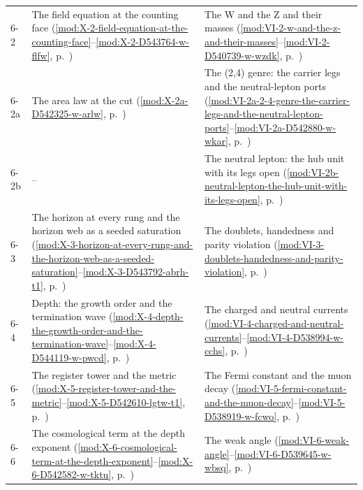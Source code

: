 {\begin{longtable}{p{11mm}p{70mm}p{60mm}}
6-2 & The field equation at the counting face (\ref{mod:X-2-field-equation-at-the-counting-face}--\ref{mod:X-2-D543764-w-flfw}, p.~\pageref{mod:X-2-field-equation-at-the-counting-face}) & The W and the Z and their masses (\ref{mod:VI-2-w-and-the-z-and-their-masses}--\ref{mod:VI-2-D540739-w-wzdk}, p.~\pageref{mod:VI-2-w-and-the-z-and-their-masses}) \\
6-2a & The area law at the cut (\ref{mod:X-2a-D542325-w-arlw}, p.~\pageref{mod:X-2a-D542325-w-arlw}) & The (2,4) genre: the carrier legs and the neutral-lepton ports (\ref{mod:VI-2a-2-4-genre-the-carrier-legs-and-the-neutral-lepton-ports}--\ref{mod:VI-2a-D542880-w-wkar}, p.~\pageref{mod:VI-2a-2-4-genre-the-carrier-legs-and-the-neutral-lepton-ports}) \\
6-2b & -- & The neutral lepton: the hub unit with its legs open (\ref{mod:VI-2b-neutral-lepton-the-hub-unit-with-its-legs-open}, p.~\pageref{mod:VI-2b-neutral-lepton-the-hub-unit-with-its-legs-open}) \\
6-3 & The horizon at every rung and the horizon web as a seeded saturation (\ref{mod:X-3-horizon-at-every-rung-and-the-horizon-web-as-a-seeded-saturation}--\ref{mod:X-3-D543792-abrh-t1}, p.~\pageref{mod:X-3-horizon-at-every-rung-and-the-horizon-web-as-a-seeded-saturation}) & The doublets, handedness and parity violation (\ref{mod:VI-3-doublets-handedness-and-parity-violation}, p.~\pageref{mod:VI-3-doublets-handedness-and-parity-violation}) \\
6-4 & Depth: the growth order and the termination wave (\ref{mod:X-4-depth-the-growth-order-and-the-termination-wave}--\ref{mod:X-4-D544119-w-pwcd}, p.~\pageref{mod:X-4-depth-the-growth-order-and-the-termination-wave}) & The charged and neutral currents (\ref{mod:VI-4-charged-and-neutral-currents}--\ref{mod:VI-4-D538994-w-cchs}, p.~\pageref{mod:VI-4-charged-and-neutral-currents}) \\
6-5 & The register tower and the metric (\ref{mod:X-5-register-tower-and-the-metric}--\ref{mod:X-5-D542610-lgtw-t1}, p.~\pageref{mod:X-5-register-tower-and-the-metric}) & The Fermi constant and the muon decay (\ref{mod:VI-5-fermi-constant-and-the-muon-decay}--\ref{mod:VI-5-D538919-w-fcwo}, p.~\pageref{mod:VI-5-fermi-constant-and-the-muon-decay}) \\
6-6 & The cosmological term at the depth exponent (\ref{mod:X-6-cosmological-term-at-the-depth-exponent}--\ref{mod:X-6-D542582-w-tktu}, p.~\pageref{mod:X-6-cosmological-term-at-the-depth-exponent}) & The weak angle (\ref{mod:VI-6-weak-angle}--\ref{mod:VI-6-D539645-w-wbsq}, p.~\pageref{mod:VI-6-weak-angle}) \\

\end{longtable}}
